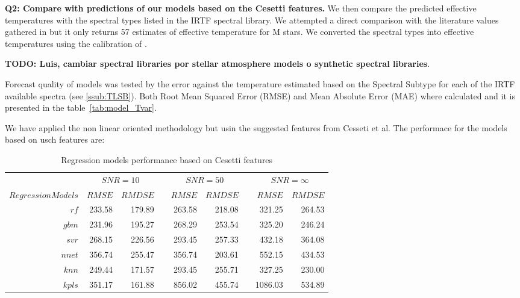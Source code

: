 
{\bf Q2: Compare with predictions of our models based on the Cesetti features.}
We then compare the predicted effective temperatures with the spectral
types listed in the IRTF spectral library. We attempted a direct
comparison with the literature values gathered in \cite{cesetti} but
it only returns 57 estimates of effective temperature for M stars. We
converted the spectral types into effective temperatures using the
calibration of \cite{2009ApJ...702..154S}.

{\bf TODO: Luis, cambiar spectral libraries por stellar atmosphere
models o synthetic spectral libraries}.

Forecast quality of models was tested by the error against the
temperature estimated based on the Spectral Subtype for each of the
IRTF available spectra (see \ref{ssub:TLSB}).  Both Root Mean Squared
Error (RMSE) and Mean Absolute Error (MAE) where calculated and it is
presented in the table~\ref{tab:model_Tvar}.



We have applied the non linear oriented methodology but usin the suggested features from Cesseti et al.
The performace for the models based on usch features are:

\begin{table}\centering
{}
\begin{tabular}{@{}rrrcrrcrr@{}}\toprule
& \multicolumn{2}{c}{$SNR = 10$} & \phantom{ab}& \multicolumn{2}{c}{$SNR = 50$} &
\phantom{ab} & \multicolumn{2}{c}{$SNR = \infty$}\\
\cmidrule{2-3} \cmidrule{5-6} \cmidrule{8-9}

$Regression Models$ & $RMSE$ & $RMDSE$ && $RMSE$ & $RMDSE$ && $RMSE$ & $RMDSE$ \\ \midrule
$rf $               & 233.58 & 179.89 && 263.58 & 218.08 && 321.25 & 264.53 \\
$ gbm $              & 231.96 & 195.27 && 268.29 & 253.54 && 325.20 & 246.24 \\
$ svr $             & 268.15 & 226.56 && 293.45 & 257.33 && 432.18 & 364.08 \\
$ nnet $            & 356.74 & 255.47 && 356.74 & 203.61 && 552.15 & 434.53 \\
$ knn $             & 249.44 & 171.57 && 293.45 & 255.71 && 327.25 & 230.00  \\
$ kpls $            & 351.17 & 161.88 && 856.02 & 455.74 && 1086.03 & 534.89 \\

\hline
\end{tabular}
\caption {Regression models performance based on Cesetti features} 
\label{tab:tab_CS_Model}
\end{table}

